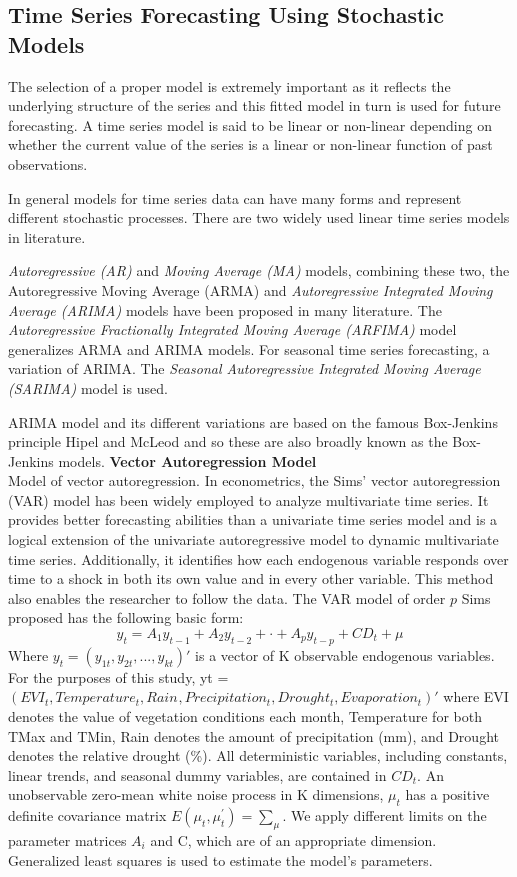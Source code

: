  \subsection{Time Series Forecasting Using Stochastic Models}
 The selection of a proper model is extremely important as it reflects the underlying structure of the series and this fitted model in turn is
 used for future forecasting. A time series model is said to be linear or non-linear depending on whether the current value of the series is a
 linear or non-linear function of past observations.
 
 In general models for time series data can have many forms and represent different stochastic processes. There are two widely used linear time series models in literature.
 
 \emph{Autoregressive (AR)} and \emph{Moving Average (MA)} models, combining these two, the Autoregressive Moving Average (ARMA) and  \emph{Autoregressive Integrated Moving Average (ARIMA)} models have been proposed in many literature. The \emph{Autoregressive Fractionally Integrated Moving Average (ARFIMA)} model generalizes ARMA and ARIMA models. For seasonal time series forecasting, a variation of ARIMA. The  \emph{Seasonal Autoregressive Integrated Moving Average (SARIMA)}  model is used.
 
 ARIMA model and its different variations are based on the famous Box-Jenkins principle Hipel and McLeod \parencite{hipel1994time} and so these are also broadly known as the Box-Jenkins models.
\textbf{Vector Autoregression Model}\\
Model of vector autoregression. In econometrics, the Sims' vector autoregression (VAR) model has been widely employed to analyze multivariate time series. It provides better forecasting abilities than a univariate time series model and is a logical extension of the univariate autoregressive model to dynamic multivariate time series. Additionally, it identifies how each endogenous variable responds over time to a shock in both its own value and in every other variable. This method also enables the researcher to follow the data. The VAR model of order $p$ Sims \parencite{sims1980macroeconomics} proposed has the following basic form:
\begin{equation}
	y_{t} = A_{1}y_{t-1} + A_{2}y_{t-2} +\cdot+A_{p}y_{t-p}+ CD_{t} + \mu 
\end{equation}
Where $ y_{t} = \left( y_{1t},y_{2t},...,y_{kt}\right)'$ is a vector of K observable endogenous variables. For the purposes of this study, yt = $(EVI_{t}, Temperature_{t}, Rain_{}, Precipitation_{t},Drought_{t},Evaporation_{t})'$ where EVI denotes the value of vegetation conditions  each month, Temperature for both TMax and TMin, Rain denotes the amount of precipitation (mm), and Drought denotes the relative drought (\%). All deterministic variables, including constants, linear trends, and seasonal dummy variables, are contained in $CD_{t}$. An unobservable zero-mean white noise process in K dimensions, $\mu_{t}$ has a positive definite covariance matrix $E(\mu_{t},\mu_{t}^{'}) = \sum_{\mu}$. We  apply different limits on the parameter matrices $A_{i}$ and C, which are of an appropriate dimension.
Generalized least squares is used to estimate the model's parameters.

